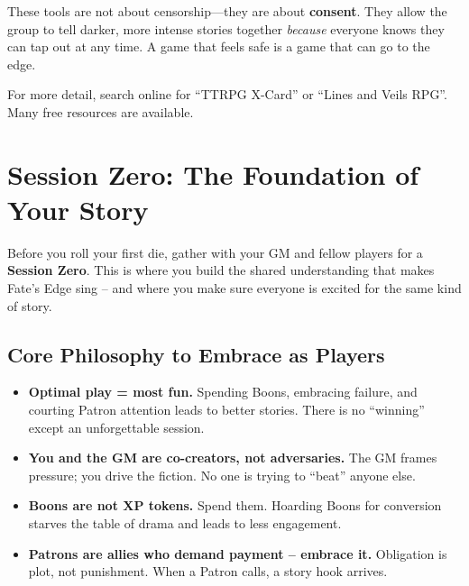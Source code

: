 \begin{tcolorbox}[colback=red!5!white, colframe=red!75!black, title=\textbf{Safety Tools: Lines, Veils \& X-Card}, fonttitle=\bfseries\large,breakable]
\medskip
\noindent These tools are not about censorship---they are about \textbf{consent}. They allow the group to tell darker, more intense stories together \emph{because} everyone knows they can tap out at any time. A game that feels safe is a game that can go to the edge.

\medskip
\noindent For more detail, search online for ``TTRPG X-Card'' or ``Lines and Veils RPG''. Many free resources are available.
\end{tcolorbox}

\section*{Session Zero: The Foundation of Your Story}
\label{sec:session-zero-player}

Before you roll your first die, gather with your GM and fellow players for a \textbf{Session Zero}. This is where you build the shared understanding that makes Fate's Edge sing -- and where you make sure everyone is excited for the same kind of story.

\subsection*{Core Philosophy to Embrace as Players}
\begin{itemize}
    \item \textbf{Optimal play = most fun.} Spending Boons, embracing failure, and courting Patron attention leads to better stories. There is no ``winning'' except an unforgettable session.
    \item \textbf{You and the GM are co-creators, not adversaries.} The GM frames pressure; you drive the fiction. No one is trying to ``beat'' anyone else.
    \item \textbf{Boons are not XP tokens.} Spend them. Hoarding Boons for conversion starves the table of drama and leads to less engagement.
    \item \textbf{Patrons are allies who demand payment -- embrace it.} Obligation is plot, not punishment. When a Patron calls, a story hook arrives.
\end{itemize}

